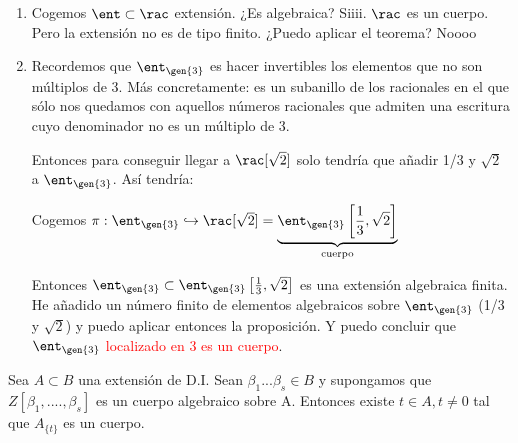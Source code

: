 \begin{example}
	\begin{enumerate}
		\item Cogemos $\ent \subset \rac$ extensión. ¿Es algebraica? Siiii. $\rac$ es un cuerpo. Pero la extensión no es de tipo finito. ¿Puedo aplicar el teorema?  Noooo
		\item 
		Recordemos que $\ent_{\gen{3}}$ es hacer invertibles los elementos que no son múltiplos de 3. Más concretamente: es un subanillo de los racionales en el que sólo nos quedamos con aquellos números racionales que admiten una escritura cuyo denominador no es un múltiplo de 3.
		
		Entonces para conseguir llegar a $\rac[\sqrt{2}]$ solo tendría que añadir 1/3 y $\sqrt{2}$ a $\ent_{\gen{3}}$. Así tendría:
		
		Cogemos $\pi: \ent_{\gen{3}} \hookrightarrow \rac[\sqrt{2}]=
		\underbrace{\ent_{\gen{3}}\left[\frac{1}{3}, \sqrt{2}\right]}_{\text{cuerpo}}$

		Entonces $\ent_{\gen{3}} \subset	 \ent_{\gen{3}}\left[\frac{1}{3},\sqrt{2}\right]$ es una extensión algebraica finita. He añadido un número finito de elementos algebraicos sobre $\ent_{\gen{3}}$ (1/3 y $\sqrt{2}$) y puedo aplicar entonces la proposición. Y puedo concluir que \textcolor{red}{$\ent_{\gen{3}}$ localizado en 3 es un cuerpo}.	
	\end{enumerate}
\end{example}

\begin{prop}
	Sea $A \subset B$ una extensión de D.I. Sean $\beta_1...\beta_s \in B$ y supongamos que $Z[\beta_1,....,\beta_s]$ es un cuerpo algebraico sobre A. Entonces existe $t \in A, t \neq 0$ tal que $A_{\{t\}}$ es un cuerpo.
\end{prop}

